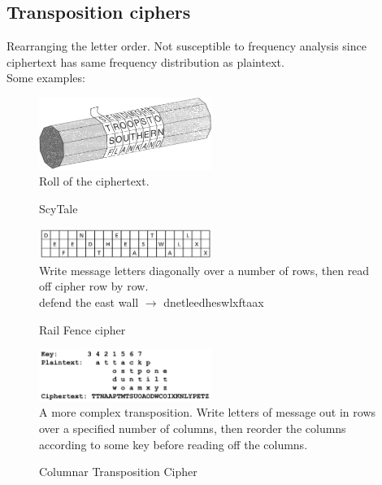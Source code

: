 \documentclass[11pt,british,faculty=ea,layout=titlefont,underline=false,titleUppercase=true,titleUnderline=true,hidelinks]{ugent2016-report}
\begin{document}
		\subsection{Transposition ciphers} \label{sub:transposition-ciphers}
		Rearranging the letter order. Not susceptible to frequency analysis since ciphertext has same frequency distribution as plaintext. \\
		Some examples:
		\begin{figure}[ht]
			\centering
			\includegraphics[width=0.5\textwidth]{images/scytale.png}\\
			Roll of the ciphertext.
			\caption{ScyTale}
		\end{figure}
		\begin{figure}[ht]
			\centering
			\includegraphics[width=0.5\textwidth]{images/rail-fence-cipher.jpeg} \\
			Write message letters diagonally over a number of rows, then read off cipher row by row.\\
			defend the east wall $\rightarrow$ dnetleedheswlxftaax
			\caption{Rail Fence cipher}
		\end{figure}
		\begin{figure}[h!t]
			\centering
			\includegraphics[width=0.5\textwidth]{images/columnar-transposition-cipher.png} \\
			A more complex transposition. Write letters of message out in rows over a specified number of columns, then reorder the columns according to some key before reading off the columns.
			\caption{Columnar Transposition Cipher}
		\end{figure}
\end{document}
